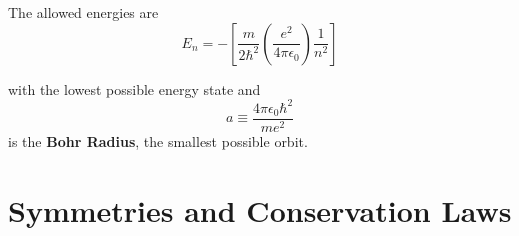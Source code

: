 \documentclass[11pt]{article}
\begin{document}
\noindent The allowed energies are 
\[ 
    E_{n} = -\left[\frac{m}{2\hbar^{2}}\left(\frac{e^{2}}{4\pi\epsilon_{0}}\right)\frac{1}{n^{2}}\right] 
\]

\noindent with the lowest possible energy state and
\[ 
    a \equiv \frac{4\pi \epsilon_{0}\hbar^{2}}{me^{2}} 
\]
is the \textbf{Bohr Radius}, the smallest possible orbit.
\section{Symmetries and Conservation Laws}
\end{document}
